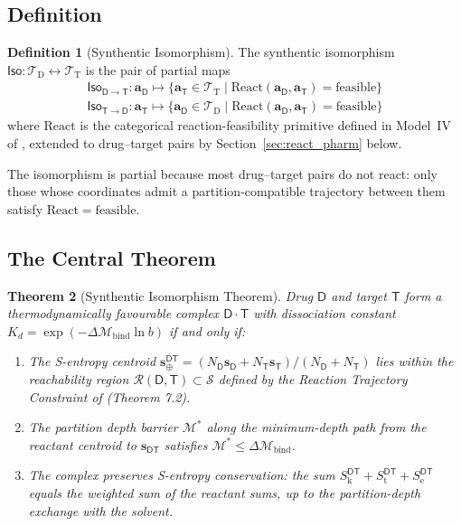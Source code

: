 \documentclass[11pt,twocolumn,a4paper]{article}
\newtheorem{theorem}{Theorem}[section]
\theoremstyle{definition}
\newtheorem{definition}[theorem]{Definition}
\theoremstyle{remark}
\newcommand{\Sk}{S_{\mathrm{k}}}
\newcommand{\St}{S_{\mathrm{t}}}
\newcommand{\Se}{S_{\mathrm{e}}}
\newcommand{\Sspace}{\mathcal{S}}
\newcommand{\Depth}{\mathcal{M}}
\newcommand{\Trie}{\mathcal{T}}
\newcommand{\Dtrie}{\Trie_{\mathrm{D}}}
\newcommand{\Ttrie}{\Trie_{\mathrm{T}}}
\newcommand{\Drug}{\mathsf{D}}
\newcommand{\Target}{\mathsf{T}}
\newcommand{\Iso}{\mathsf{Iso}}
\newcommand{\drugaddr}{\mathbf{a}_\Drug}
\newcommand{\targaddr}{\mathbf{a}_\Target}
\begin{document}
\subsection{Definition}

\begin{definition}[Synthentic Isomorphism]
\label{def:synthentic_iso}
The synthentic isomorphism $\Iso: \Dtrie \leftrightarrow \Ttrie$ is the pair of partial maps
\begin{align*}
\Iso_{\Drug \to \Target}: \drugaddr \mapsto \{\targaddr \in \Ttrie \mid \mathrm{React}(\drugaddr, \targaddr) = \mathrm{feasible}\} \\
\Iso_{\Target \to \Drug}: \targaddr \mapsto \{\drugaddr \in \Dtrie \mid \mathrm{React}(\drugaddr, \targaddr) = \mathrm{feasible}\}
\end{align*}
where $\mathrm{React}$ is the categorical reaction-feasibility primitive defined in Model~IV of \citep{sachikonye2025d}, extended to drug--target pairs by Section~\ref{sec:react_pharm} below.
\end{definition}

The isomorphism is partial because most drug--target pairs do not react: only those whose coordinates admit a partition-compatible trajectory between them satisfy $\mathrm{React} = \mathrm{feasible}$.

\subsection{The Central Theorem}

\begin{theorem}[Synthentic Isomorphism Theorem]
\label{thm:synthentic_iso}
Drug $\Drug$ and target $\Target$ form a thermodynamically favourable complex $\Drug \cdot \Target$ with dissociation constant $K_d = \exp(-\Delta\Depth_{\mathrm{bind}} \ln b)$ if and only if:
\begin{enumerate}[nosep,label=(\roman*)]
\item The S-entropy centroid $\mathbf{s}_{\oplus}^{\Drug\Target} = (N_\Drug \mathbf{s}_\Drug + N_\Target \mathbf{s}_\Target)/(N_\Drug + N_\Target)$ lies within the reachability region $\mathcal{R}(\Drug, \Target) \subset \Sspace$ defined by the Reaction Trajectory Constraint of \citep{sachikonye2025d} (Theorem 7.2).
\item The partition depth barrier $\Depth^*$ along the minimum-depth path from the reactant centroid to $\mathbf{s}_{\Drug\Target}$ satisfies $\Depth^* \leq \Delta\Depth_{\mathrm{bind}}$.
\item The complex preserves S-entropy conservation: the sum $\Sk^{\Drug\Target} + \St^{\Drug\Target} + \Se^{\Drug\Target}$ equals the weighted sum of the reactant sums, up to the partition-depth exchange with the solvent.
\end{enumerate}
\end{theorem}
\end{document}
